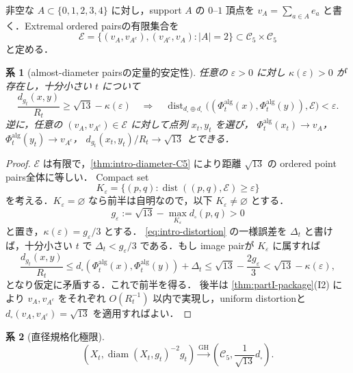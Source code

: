 \documentclass[a4paper,11pt]{ltjsarticle}
\numberwithin{equation}{section}
\theoremstyle{plain}
\newtheorem{corollary}[corollary]{系}
\theoremstyle{definition}
\theoremstyle{remark}
\newcommand{\cC}{\mathcal C}
\newcommand{\diam}{\operatorname{diam}}
\newcommand{\dist}{\operatorname{dist}}
\newcommand{\GH}{\mathrm{GH}}
\begin{document}
非空な $A\subset\{0,1,2,3,4\}$ に対し，support $A$ の $0$--$1$ 頂点を
$v_A=\sum_{a\in A}e_a$ と書く．Extremal ordered pairsの有限集合を
\begin{equation}\label{eq:extremal-pair-set}
 \mathscr E
 =\bigl\{(v_A,v_{A^c}),(v_{A^c},v_A): |A|=2\bigr\}
 \subset\cC_5\times\cC_5
\end{equation}
と定める．

\begin{corollary}[almost-diameter pairsの定量的安定性]\label{cor:diameter-pair-stability}
任意の $\varepsilon>0$ に対し $\kappa(\varepsilon)>0$ が存在し，十分小さい $t$ について
\[
 \frac{d_{g_t}(x,y)}{R_t}\ge\sqrt{13}-\kappa(\varepsilon)
 \quad\Longrightarrow\quad
 \dist_{d_\square\oplus d_\square}
 \bigl((\Phi_t^{\mathrm{alg}}(x),\Phi_t^{\mathrm{alg}}(y)),\mathscr E\bigr)<\varepsilon.
\]
逆に，任意の $(v_A,v_{A^c})\in\mathscr E$ に対して点列 $x_t,y_t$ を選び，
$\Phi_t^{\mathrm{alg}}(x_t)\to v_A$，$\Phi_t^{\mathrm{alg}}(y_t)\to v_{A^c}$，
$d_{g_t}(x_t,y_t)/R_t\to\sqrt{13}$ とできる．
\end{corollary}

\begin{proof}
$\mathscr E$ は有限で，\cref{thm:intro-diameter-C5} により距離 $\sqrt{13}$ の ordered point pairs全体に等しい．
Compact set
\[
 K_\varepsilon
 =\{(p,q):\dist((p,q),\mathscr E)\ge\varepsilon\}
\]
を考える．$K_\varepsilon=\varnothing$ なら前半は自明なので，以下 $K_\varepsilon\ne\varnothing$ とする．
\[
 g_\varepsilon
 :=\sqrt{13}-\max_{K_\varepsilon}d_\square(p,q)>0
\]
と置き，$\kappa(\varepsilon)=g_\varepsilon/3$ とする．
\eqref{eq:intro-distortion} の一様誤差を $\Delta_t$ と書けば，十分小さい $t$ で
$\Delta_t<g_\varepsilon/3$ である．もし image pairが $K_\varepsilon$ に属すれば
\[
 \frac{d_{g_t}(x,y)}{R_t}
 \le d_\square(\Phi_t^{\mathrm{alg}}(x),\Phi_t^{\mathrm{alg}}(y))+\Delta_t
 \le\sqrt{13}-\frac{2g_\varepsilon}{3}
 <\sqrt{13}-\kappa(\varepsilon),
\]
となり仮定に矛盾する．これで前半を得る．
後半は \cref{thm:partI-package}(I2) により $v_A,v_{A^c}$ をそれぞれ
$O(R_t^{-1})$ 以内で実現し，uniform distortionと
$d_\square(v_A,v_{A^c})=\sqrt{13}$ を適用すればよい．
\end{proof}


\begin{corollary}[直径規格化極限]\label{cor:diameter-normalized}
\begin{equation}\label{eq:diameter-normalized-GH}
 \left(X_t,\diam(X_t,g_t)^{-2}g_t\right)
 \xrightarrow{\GH}
 \left(\cC_5,\frac1{\sqrt{13}}d_\square\right).
\end{equation}
\end{corollary}
\end{document}
